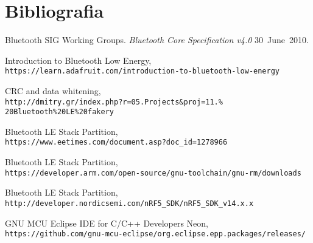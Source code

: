 
\section{Bibliografia}

\begin{thebibliography}{9}

Bluetooth SIG Working Groups. 
\textit{Bluetooth\textsuperscript{\textregistered} Core Specification v4.0}
\mbox{30 June 2010}.

Introduction to Bluetooth Low Energy, 
\\\texttt{https://learn.adafruit.com/introduction-to-bluetooth-low-energy}
 
CRC and data whitening, 
\\\texttt{http://dmitry.gr/index.php?r=05.Projects\&proj=11.\% 20Bluetooth\%20LE\%20fakery}

Bluetooth LE Stack Partition, 
\\\texttt{https://www.eetimes.com/document.asp?doc\_id=1278966}

Bluetooth LE Stack Partition, 
\\\texttt{https://developer.arm.com/open-source/gnu-toolchain/gnu-rm/downloads}

Bluetooth LE Stack Partition, 
\\\texttt{http://developer.nordicsemi.com/nRF5\_SDK/nRF5\_SDK\_v14.x.x}

GNU MCU Eclipse IDE for C/C++ Developers Neon, 
\\\texttt{https://github.com/gnu-mcu-eclipse/org.eclipse.epp.packages/releases/}


\end{thebibliography}